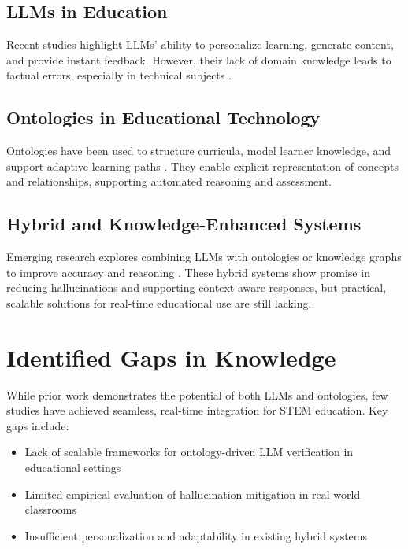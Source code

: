 \subsection{LLMs in Education}
Recent studies highlight LLMs' ability to personalize learning, generate content, and provide instant feedback. However, their lack of domain knowledge leads to factual errors, especially in technical subjects \cite{ji2023survey, su2024confabulation, huang2024survey}.

\subsection{Ontologies in Educational Technology}
Ontologies have been used to structure curricula, model learner knowledge, and support adaptive learning paths \cite{sage2024ontological, medium2024hallucination, sage2021stem}. They enable explicit representation of concepts and relationships, supporting automated reasoning and assessment.

\subsection{Hybrid and Knowledge-Enhanced Systems}
Emerging research explores combining LLMs with ontologies or knowledge graphs to improve accuracy and reasoning \cite{hartl2024knowledge, scibite2024ontologies, nananukul2023halo}. These hybrid systems show promise in reducing hallucinations and supporting context-aware responses, but practical, scalable solutions for real-time educational use are still lacking.


\section{Identified Gaps in Knowledge}

While prior work demonstrates the potential of both LLMs and ontologies, few studies have achieved seamless, real-time integration for STEM education. Key gaps include:
\begin{itemize}
    \item Lack of scalable frameworks for ontology-driven LLM verification in educational settings
    \item Limited empirical evaluation of hallucination mitigation in real-world classrooms
    \item Insufficient personalization and adaptability in existing hybrid systems
\end{itemize}


